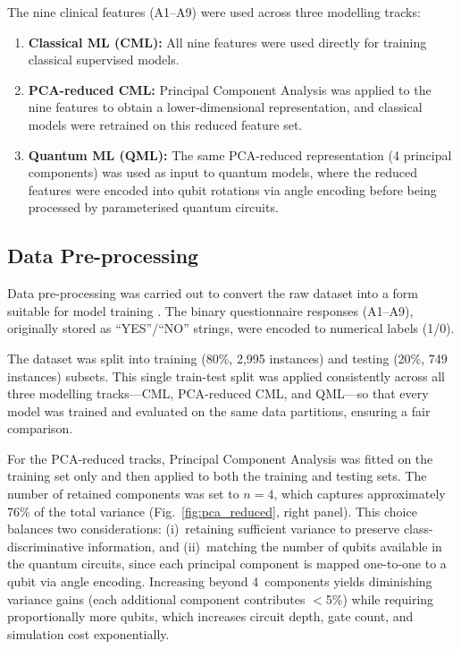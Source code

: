 \documentclass[runningheads]{llncs}
\begin{document}
The nine clinical features (A1--A9) were used across three modelling tracks:
\begin{enumerate}
    \item \textbf{Classical ML (CML):} All nine features were used directly for training classical supervised models.
    \item \textbf{PCA-reduced CML:} Principal Component Analysis was applied to the nine features to obtain a lower-dimensional representation, and classical models were retrained on this reduced feature set.
    \item \textbf{Quantum ML (QML):} The same PCA-reduced representation (4 principal components) was used as input to quantum models, where the reduced features were encoded into qubit rotations via angle encoding before being processed by parameterised quantum circuits.
\end{enumerate}

\subsection{Data Pre-processing}

Data pre-processing was carried out to convert the raw dataset into a form suitable for model training \cite{kotsiantis2006}. The binary questionnaire responses (A1--A9), originally stored as ``YES''/``NO'' strings, were encoded to numerical labels (1/0).

The dataset was split into training (80\%, 2{,}995 instances) and testing (20\%, 749 instances) subsets. This single train-test split was applied consistently across all three modelling tracks---CML, PCA-reduced CML, and QML---so that every model was trained and evaluated on the same data partitions, ensuring a fair comparison.

For the PCA-reduced tracks, Principal Component Analysis was fitted on the training set only and then applied to both the training and testing sets. The number of retained components was set to $n=4$, which captures approximately 76\% of the total variance (Fig.~\ref{fig:pca_reduced}, right panel). This choice balances two considerations: (i)~retaining sufficient variance to preserve class-discriminative information, and (ii)~matching the number of qubits available in the quantum circuits, since each principal component is mapped one-to-one to a qubit via angle encoding. Increasing beyond 4~components yields diminishing variance gains (each additional component contributes $<$5\%) while requiring proportionally more qubits, which increases circuit depth, gate count, and simulation cost exponentially.
\end{document}
